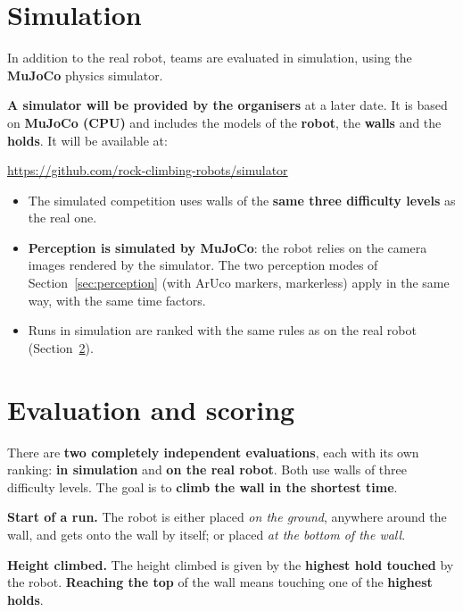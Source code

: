 \documentclass[11pt,a4paper]{article}
\begin{document}
\section{Simulation}
\label{sec:simulation}

In addition to the real robot, teams are evaluated in simulation, using the
\textbf{MuJoCo} physics simulator.

\textbf{A simulator will be provided by the organisers} at a later date. It is
based on \textbf{MuJoCo (CPU)} and includes the models of the \textbf{robot},
the \textbf{walls} and the \textbf{holds}. It will be available at:

\medskip
\noindent\url{https://github.com/rock-climbing-robots/simulator}
\medskip

\begin{itemize}
  \item The simulated competition uses walls of the \textbf{same
        three difficulty levels} as the real one.
  \item \textbf{Perception is simulated by MuJoCo}: the robot relies on the
        camera images rendered by the simulator. The two perception modes of
        Section~\ref{sec:perception} (with ArUco markers, markerless) apply in
        the same way, with the same time factors.
  \item Runs in simulation are ranked with the same rules as on the real
        robot (Section~\ref{sec:scoring}).
\end{itemize}

\section{Evaluation and scoring}
\label{sec:scoring}

There are \textbf{two completely independent evaluations}, each with its own
ranking: \textbf{in simulation} and \textbf{on the real robot}. Both use walls
of three difficulty levels. The goal is to \textbf{climb the wall in the
shortest time}.

\textbf{Start of a run.} The robot is either placed \emph{on the ground},
anywhere around the wall, and gets onto the wall by itself; or placed \emph{at
the bottom of the wall}.

\textbf{Height climbed.} The height climbed is given by the \textbf{highest hold
touched} by the robot. \textbf{Reaching the top} of the wall means touching one
of the \textbf{highest holds}.
\end{document}
